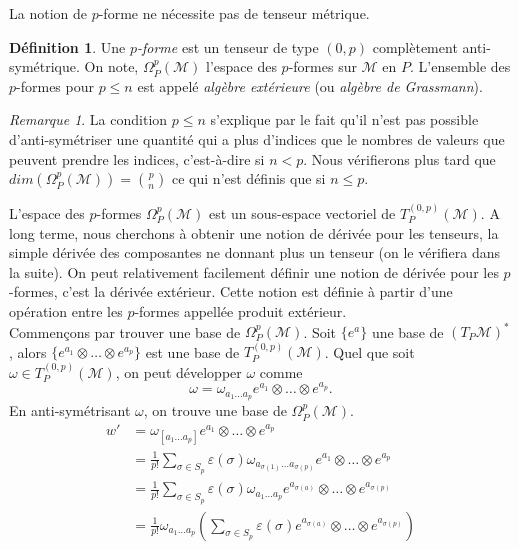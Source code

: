 \documentclass[a4paper,11pt]{report}
\theoremstyle{definition}
\theoremstyle{plain}
\theoremstyle{definition}
\newtheorem{defn}{Définition}[chapter]
\theoremstyle{remark}
\newtheorem{rmk}{Remarque}[chapter]
\newcommand{\M}{\mathscr{M}}
\begin{document}
            La notion de $p$-forme ne nécessite pas de tenseur métrique.
            
            \begin{defn}
                Une $p$\textit{-forme} est un tenseur de type $(0,p)$ complètement anti-symétrique. On note, $\Omega_P^p(\M)$ l'espace des $p$-formes sur $\M$ en $P$. L'ensemble des $p$-formes pour $p\leq n$ est appelé \textit{algèbre extérieure} (ou \textit{algèbre de Grassmann}).
            \end{defn}
            
            \begin{rmk}
                La condition $p\leq n$ s'explique par le fait qu'il n'est pas possible d'anti-symétriser une quantité qui a plus d'indices que le nombres de valeurs que peuvent prendre les indices, c'est-à-dire si $n<p$. Nous vérifierons plus tard que $dim(\Omega_P^p(\M)) = {p \choose n}$ ce qui n'est définis que si $n\leq p$.
            \end{rmk}
            
             L'espace des $p$-formes $\Omega_P^p(\M)$ est un sous-espace vectoriel de $T_P^{(0,p)}(\M)$. A long terme, nous cherchons à obtenir une notion de dérivée pour les tenseurs, la simple dérivée des composantes ne donnant plus un tenseur (on le vérifiera dans la suite). On peut relativement facilement définir une notion de dérivée pour les $p$-formes, c'est la dérivée extérieur. Cette notion est définie à partir d'une opération entre les $p$-formes appellée produit extérieur.\\
            
            Commençons par trouver une base de $\Omega_P^p(\M)$. Soit $\{e^a\}$ une base de $(T_P\M)^*$, alors $\{e^{a_1}\otimes\dots \otimes e^{a_p}\}$ est une base de $T_P^{(0,p)}(\M)$. Quel que soit $\omega\in T_P^{(0,p)}(\M)$, on peut développer $\omega$ comme
            \begin{equation}
                \omega = \omega_{a_1\dots a_p} e^{a_1}\otimes\dots\otimes e^{a_p}.
            \end{equation}
            En anti-symétrisant $\omega$, on trouve une base de $\Omega_P^p(\M)$.
            \begin{align}\label{dev:pformebase}
                w' &= \omega_{[a_1\dots a_p]} e^{a_1}\otimes\dots\otimes e^{a_p}\\
                &= \frac{1}{p!} \sum_{\sigma\in S_p}\varepsilon(\sigma) \omega_{a_{\sigma(1)}\dots a_{\sigma(p)}} e^{a_1}\otimes\dots\otimes e^{a_p}\\
                &= \frac{1}{p!} \sum_{\sigma\in S_p}\varepsilon(\sigma) \omega_{a_1\dots a_p} e^{a_{\sigma(a)}}\otimes\dots\otimes e^{a_{\sigma(p)}}\\
                &= \frac{1}{p!}\omega_{a_1\dots a_p} \left( \sum_{\sigma\in S_p}\varepsilon(\sigma)  e^{a_{\sigma(a)}}\otimes\dots\otimes e^{a_{\sigma(p)}}\right)\label{eq:pformebase}
            \end{align}
            
\end{document}
